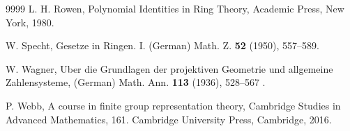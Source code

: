\documentclass{amsart}
\theoremstyle{definition}
\theoremstyle{remark}
\numberwithin{equation}{section}
\begin{document}
\begin{thebibliography}{9999}
L. H. Rowen, 
Polynomial Identities in Ring Theory, Academic Press, New York, 1980.
	

W. Specht, 
Gesetze in Ringen. I. (German) 
Math. Z. {\bf 52} (1950), 557--589.

W. Wagner, 
Uber die Grundlagen der projektiven Geometrie und allgemeine Zahlensysteme,
(German) Math. Ann. \textbf{113} (1936), 528--567 .


P. Webb, A course in finite group representation theory,
Cambridge Studies in Advanced Mathematics, 161. 
Cambridge University Press, Cambridge, 2016.

\end{thebibliography}




	
\end{document}
